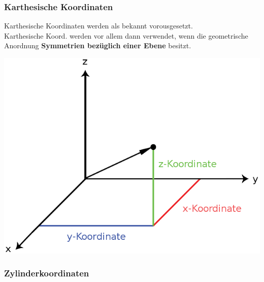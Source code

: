 	\subsubsection{Karthesische Koordinaten}

	 {}
	\beginip
	Karthesische Koordinaten werden als bekannt vorousgesetzt. \\
	Karthesische Koord. werden vor allem dann verwendet, wenn die geometrische Anordnung \textbf{Symmetrien bezüglich einer Ebene} besitzt.
	\begin{center}
		\includegraphics[scale=0.3]{img/cartesian.png}
	\end{center}
	\iend

	\newpage

	\subsubsection{Zylinderkoordinaten}

